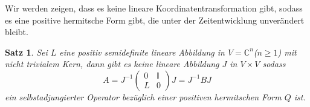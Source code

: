 \documentclass[11pt,a4paper,leqno]{report}
\newtheorem{proposition}{Satz}[chapter]
\numberwithin{equation}{chapter}
\begin{document}
Wir werden zeigen, dass es keine lineare Koordinatentransformation gibt, sodass es eine positive hermitsche Form gibt, die unter der Zeitentwicklung unver\"andert bleibt.
\begin{proposition}
	Sei $L$ eine positiv semidefinite lineare Abbildung in $V=\mathbb{C}^n$($n\geq 1$) mit nicht trivialem Kern, dann gibt es keine lineare Abbildung $J$ in $V\times V$ sodass
	\begin{equation}
		A=J^{-1}\begin{pmatrix}
			0 & \mathbb{I} \\ 
			L & 0
		\end{pmatrix}J=J^{-1}BJ
	\end{equation}
	ein selbstadjungierter Operator bez\"uglich einer positiven hermitschen Form $Q$ ist.
\end{proposition}
\end{document}
